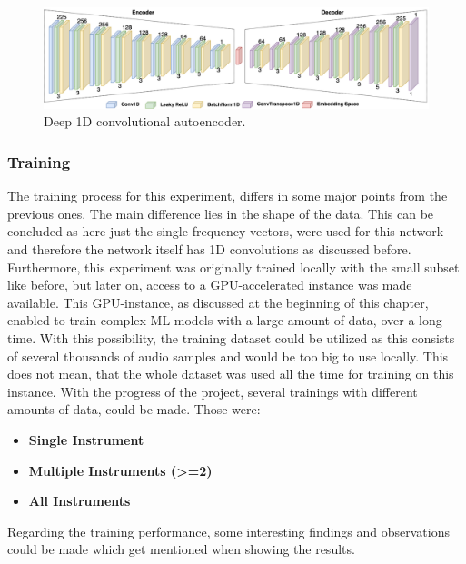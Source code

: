  \begin{figure}[htb!]
	\caption{Deep 1D convolutional autoencoder.}
	\label{fig:cae_1D}
	\centering
	\includegraphics[width=\textwidth]{images/experiments/autoencoder_deep_1D.png}
\end{figure}


\subsubsection{Training}
The training process for this experiment, differs in some major points from the previous ones. The main difference lies in the shape of the data. This can be concluded as here just the single frequency vectors, were used for this network and therefore the network itself has 1D convolutions as discussed before. Furthermore, this experiment was originally trained locally with the small subset like before, but later on, access to a GPU-accelerated instance was made available. This GPU-instance, as discussed at the beginning of this chapter, enabled to train complex ML-models with a large amount of data, over a long time. With this possibility, the training dataset could be utilized as this consists of several thousands of audio samples and would be too big to use locally. This does not mean, that the whole dataset was used all the time for training on this instance. With the progress of the project, several trainings with different amounts of data, could be made. Those were:\\

\begin{itemize}
    \item \textbf{Single Instrument}
    \item \textbf{Multiple Instruments (>=2)}
    \item \textbf{All Instruments}\\
\end{itemize}

\noindent
Regarding the training performance, some interesting findings and observations could be made which get mentioned when showing the results. 

